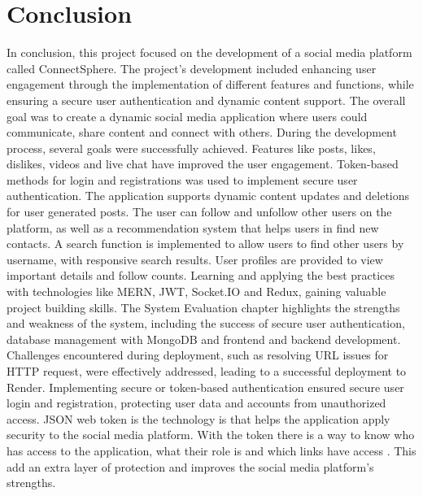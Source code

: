\chapter{Conclusion}
In conclusion, this project focused on the development of a social media platform called ConnectSphere. The project's development included enhancing user engagement through the implementation of different features and functions, while ensuring a secure user authentication and dynamic content support. The overall goal was to create a dynamic social media application where users could communicate, share content and connect with others. During the development process, several goals were successfully achieved. Features like posts, likes, dislikes, videos and live chat have improved the user engagement. Token-based methods for login and registrations was used to implement secure user authentication. The application supports dynamic content updates and deletions for user generated posts. The user can follow and unfollow other users on the platform, as well as a recommendation system that helps users in find new contacts. A search function is implemented to allow users to find other users by username, with responsive search results. User profiles are provided to view important details and follow counts. Learning and applying the best practices with technologies like MERN, JWT, Socket.IO and Redux, gaining valuable project building skills. 
\newline \newline
The System Evaluation chapter highlights the strengths and weakness of the system, including the success of secure user authentication, database management with MongoDB and frontend and backend development. Challenges encountered during deployment, such as resolving URL issues for HTTP request, were effectively addressed, leading to a successful deployment to Render. Implementing secure or token-based authentication ensured secure user login and registration, protecting user data and accounts from unauthorized access. JSON web token is the technology is that helps the application apply security to the social media platform. With the token there is a way to know who has access to the application, what their role is and which links have access \cite{haekal2016token}. This add an extra layer of protection and improves the social media platform's strengths.
\newline \newline
